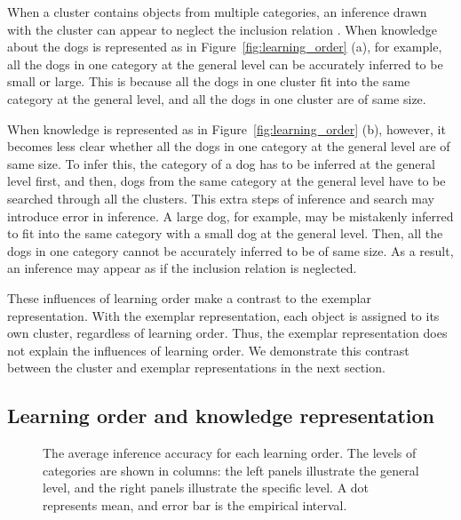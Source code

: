 \documentclass[doc]{apa6}
\begin{document}
When a cluster contains objects from multiple categories, an inference drawn with the cluster can
appear to neglect the inclusion relation \parencite[e.g.,][]{Sloman1998a}.  When knowledge about the
dogs is represented as in Figure~\ref{fig:learning_order} (a), for example, all the dogs in one
category at the general level can be accurately inferred to be small or large. This is because all
the dogs in one cluster fit into the same category at the general level, and all the dogs in one
cluster are of same size.

When knowledge is represented as in Figure~\ref{fig:learning_order} (b), however, it becomes less
clear whether all the dogs in one category at the general level are of same size. To infer this, the
category of a dog has to be inferred at the general level first, and then, dogs from the same
category at the general level have to be searched through all the clusters. This extra steps of
inference and search may introduce error in inference. A large dog, for example, may be mistakenly
inferred to fit into the same category with a small dog at the general level. Then, all the dogs in
one category cannot be accurately inferred to be of same size. As a result, an inference may appear
as if the inclusion relation is neglected.

These influences of learning order make a contrast to the exemplar representation.  With the exemplar
representation, each object is assigned to its own cluster, regardless of learning order. Thus, the
exemplar representation does not explain the influences of learning order. We demonstrate this
contrast between the cluster and exemplar representations in the next section.


\subsection*{Learning order and knowledge representation}

\begin{figure}
    \centering



    \vspace{10pt}

    \caption{The average inference accuracy for each learning order.  The levels of categories are
    shown in columns: the left panels illustrate the general level, and the right panels illustrate
    the specific level.   A dot represents mean, and error bar is the empirical interval.}

\label{fig:result2}
\end{figure}
\end{document}
